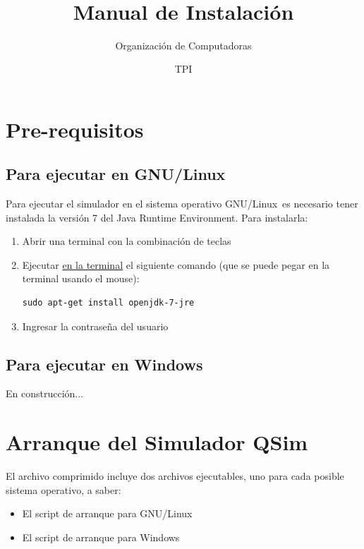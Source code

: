 \documentclass[11pt,a4paper]{article}
\title{\myTIPTitle \\\myTIPSubtitle\\ Manual de Instalación}
\author{Organización de Computadoras \and TPI}
\date{}
\newcommand{\lnx}{GNU/Linux}
\newcommand{\zip}{qsim.zip}
\begin{document}
\maketitle
\tableofcontents

\section{Pre-requisitos}

\subsection{Para ejecutar en  \lnx}

Para ejecutar el simulador en el sistema operativo \lnx\ es necesario tener instalada la versión 7 del Java Runtime Environment. Para instalarla:
\begin{enumerate}
\item Abrir una terminal con la combinación de teclas 
\item Ejecutar \underline{en la terminal} el siguiente comando (que se puede pegar en la terminal usando el mouse):
\begin{verbatim}
sudo apt-get install openjdk-7-jre
\end{verbatim}
\item Ingresar la contraseña del usuario
\end{enumerate}

\subsection{Para ejecutar en Windows}

En construcción...

\section{Arranque del Simulador QSim}

El archivo comprimido \code{\zip} incluye dos archivos ejecutables, uno para cada posible sistema operativo, a saber:

\begin{itemize}
\item El script de arranque  para \lnx\
\item El script de arranque  para Windows
\end{itemize}



\end{document}
